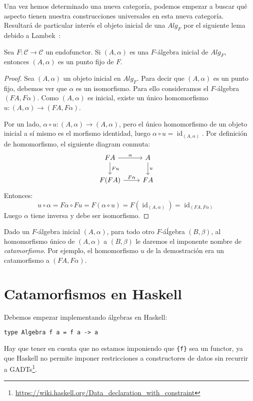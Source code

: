 \documentclass[12pt, twoside]{book}
\newcommand{\code}[1]{\Verb+{#1}+}
\newcommand{\cat}{{\mathcal{C}}}
\DeclareMathOperator{\id}{id}
\begin{document}
Una vez hemos determinado una nueva categoría, podemos empezar a buscar qué aspecto tienen nuestra construcciones universales en esta nueva categoría.
Resultará de particular interés el objeto inicial de una $Alg_F$ por el siguiente lema debido a Lambek~\cite{lambek}:

\begin{lemma}
Sea $F \colon \cat \to \cat$ un endofunctor.
Si $(A,\alpha)$ es una $F$-álgebra inicial de $Alg_F$, entonces $(A,\alpha)$ es un punto fijo de $F$.
\end{lemma}
\begin{proof}
Sea $(A,\alpha)$ un objeto inicial en $Alg_F$.
Para decir que $(A,\alpha)$ es un punto fijo, debemos ver que $\alpha$ es un isomorfismo.
Para ello consideramos el $F$-álgebra $(F A, F \alpha)$.
Como $(A,\alpha)$ es inicial, existe un único homomorfismo $u \colon (A, \alpha) \to (F A, F \alpha)$.

Por un lado, $\alpha \circ u \colon (A, \alpha) \to (A, \alpha)$, pero el único homomorfismo de un objeto inicial a sí mismo es el morfismo identidad, luego $\alpha \circ u = \id_{(A, \alpha)}$.
Por definición de homomorfismo, el siguiente diagram conmuta:
\[
\begin{tikzcd}
F A \arrow[r,"\alpha"] \arrow[d,"F u"] & A \arrow[d,"u"]\\
F (F A) \arrow[r,"F \alpha"] & F A
\end{tikzcd}
\]
Entonces:
\[ u \circ \alpha = F \alpha \circ F u = F (\alpha \circ u) = F (\id_{(A, \alpha)}) = \id_{(F A, F \alpha)} \]
Luego $\alpha$ tiene inversa y debe ser isomorfismo.
\end{proof}

Dado un $F$-álgebra inicial $(A,\alpha)$, para todo otro $F$-áĺgebra $(B,\beta)$, al homomorfismo único de $(A,\alpha)$ a $(B,\beta)$ le daremos el imponente nombre de \emph{catamorfismo}.
Por ejemplo, el homomorfismo $u$ de la demostración era un catamorfismo a $(F A, F \alpha)$.

\section{Catamorfismos en Haskell}

Debemos empezar implementando álgebras en Haskell:
\begin{verbatim}
type Algebra f a = f a -> a
\end{verbatim}
Hay que tener en cuenta que no estamos imponiendo que \code{f} sea un functor, ya que Haskell no permite imponer restricciones a constructores de datos sin recurrir a GADTs\footnote{\url{https://wiki.haskell.org/Data_declaration_with_constraint}}.
\end{document}
